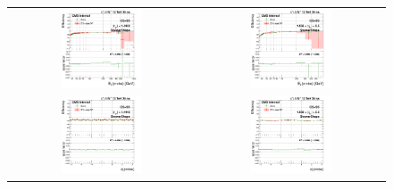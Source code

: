 \begin{figure}[bh]
  \begin{center}
    \begin{tabular}{cc}
      \includegraphics[width=0.45\textwidth]{figures/Zprime/2017/ScaleFactor/SameSign/N-1/g_compare_cut_Et_Barrel_ea_ta_inc_AS_N_1_Shower_PUW.png} &
      \includegraphics[width=0.45\textwidth]{figures/Zprime/2017/ScaleFactor/SameSign/N-1/g_compare_cut_Et_Endcap_ea_ta_inc_AS_N_1_Shower_PUW.png} \\
      \includegraphics[width=0.45\textwidth]{figures/Zprime/2017/ScaleFactor/SameSign/N-1/g_compare_cut_phi_Barrel_ea_ta_inc_AS_N_1_Shower_PUW.png} &
      \includegraphics[width=0.45\textwidth]{figures/Zprime/2017/ScaleFactor/SameSign/N-1/g_compare_cut_phi_Endcap_ea_ta_inc_AS_N_1_Shower_PUW.png} \\

\end{tabular}
\end{center}
\end{figure}
